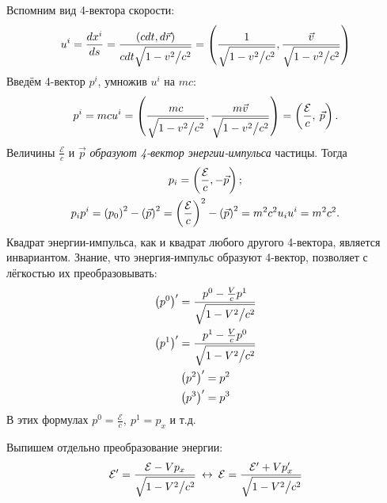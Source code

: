     Вспомним вид 4-вектора скорости:
    \[
        u^i = \frac{dx^i}{ds} = \frac{\left({cdt, d\vec{r}}\right)}{cdt\sqrt{1 - v^2 \big/ c^2}}
        = \left({\frac{1}{\sqrt{1 - v^2 \big/ c^2}}, \frac{\vec{v}}{\sqrt{1 - v^2 \big/ c^2}}}\right)
    \]
    Введём 4-вектор $p^i$, умножив $u^i$ на $mc$:
    \[
        p^i = mcu^i = \left({\frac{mc}{\sqrt{1 - v^2 \big/ c^2}}, \frac{m\vec{v}}{\sqrt{1 - v^2 \big/ c^2}}}\right)
        = \left({\frac{\mathcal{E}}{c},\: \vec{p}}\right).
    \]
    Величины $\frac{\mathcal{E}}{c}$ и $\vec{p}$ \textit{образуют 4-вектор энергии-импульса} частицы. Тогда
    \begin{gather*}
        p_i = \left({\frac{\mathcal{E}}{c}, -\vec{p}}\right);\\
        p_ip^i = \left({p_0}\right)^2 - \left({\vec{p}}\right)^2
        = \left({\frac{\mathcal{E}}{c}}\right)^2 - \left({\vec{p}}\right)^2 = m^2c^2u_iu^i = m^2c^2.
    \end{gather*}
    Квадрат энергии-импульса, как и квадрат любого другого 4-вектора, является инвариантом.
    Знание, что энергия-импульс образуют 4-вектор, позволяет с лёгкостью их преобразовывать:
    \begin{gather*}
        \left({p^0}\right)' = \frac{p^0 - \frac{V}{c}p^1}{\sqrt{1 - V^2 \big/ c^2}}\\
        \left({p^1}\right)' = \frac{p^1 - \frac{V}{c}p^0}{\sqrt{1 - V^2 \big/ c^2}}\\
        \left({p^2}\right)' = p^2\\
        \left({p^3}\right)' = p^3
    \end{gather*}
    В этих формулах $p^0 = \frac{\mathcal{E}}{c},\: p^1 = p_x$ и т.д.

    Выпишем отдельно преобразование энергии:
    \[
        \mathcal{E}' = \frac{\mathcal{E} - Vp_x}{\sqrt{1 - V^2 \big/ c^2}} \: \leftrightarrow \: \mathcal{E} = \frac{\mathcal{E}' + Vp_x'}{\sqrt{1 - V^2 \big/ c^2}}
    \]

